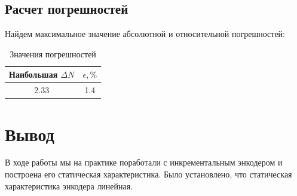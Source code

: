 \subsection{Расчет погрешностей}
Найдем максимальное значение абсолютной и относительной погрешностей:
\begin{table}[!h]
    \centering
    \label{tab:otkl}
    \begin{tabular}{|c|c|}
        \hline
        Наибольшая $\Delta N$ & $\epsilon,\%$\\        \hline
        2.33& 1.4\\ \hline
    \end{tabular}
    \caption{Значения погрешностей}

\end{table}

\newpage
\section{Вывод}
В ходе работы мы на практике поработали с инкрементальным энкодером и построена его статическая характеристика.
Было установлено, что статическая характеристика энкодера линейная.